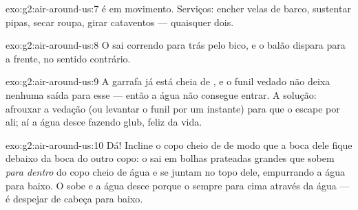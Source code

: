 \begin{solution}{exo:g2:air-around-us:7}
 é  em movimento. Serviços: encher velas de barco, sustentar
pipas, secar roupa, girar cataventos --- quaisquer dois.
\end{solution}

\begin{solution}{exo:g2:air-around-us:8}
O  sai correndo para trás pelo bico, e o balão dispara para a
frente, no sentido contrário.
\end{solution}

\begin{solution}{exo:g2:air-around-us:9}
A garrafa já está cheia de , e o funil vedado não deixa nenhuma
saída para esse  --- então a água não consegue entrar. A solução:
afrouxar a vedação (ou levantar o funil por um instante) para que o
 escape por ali; aí a água desce fazendo glub, feliz da vida.
\end{solution}

\begin{solution}{exo:g2:air-around-us:10}
Dá! Incline o copo cheio de  de modo que a boca dele fique debaixo
da boca do outro copo: o  sai em bolhas prateadas grandes que sobem
\emph{para dentro} do copo cheio de água e se juntam no topo dele,
empurrando a água para baixo. O  sobe e a água desce porque o 
sempre  para cima através da água --- é despejar de cabeça para
baixo.
\end{solution}
